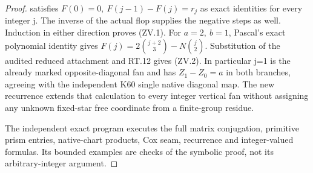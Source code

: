 \begin{proof}
satisfies \(F(0)=0,\ F(j-1)-F(j)=r_j\) as exact identities for every
integer j. The inverse of the actual flop supplies the negative steps
as well. Induction in either direction proves (ZV.1). For \(a=2,\ b=1\),
Pascal's exact polynomial identity gives \(F(j)=2\binom{j+2}{3}-N\binom j2\).
Substitution of the audited reduced attachment and RT.12 gives (ZV.2).
In particular j=1 is the already marked opposite-diagonal fan and
has \(Z_1-Z_0=a\) in both branches, agreeing with the independent K60
single native diagonal map. The new recurrence extends that
calculation to every integer vertical fan without assigning any
unknown fixed-star free coordinate from a finite-group residue.

The independent exact program
 executes the full
matrix conjugation, primitive prism entries, native-chart products,
Cox seam, recurrence and integer-valued formulas. Its bounded examples
are checks of the symbolic proof, not its arbitrary-integer argument.

\end{proof}
